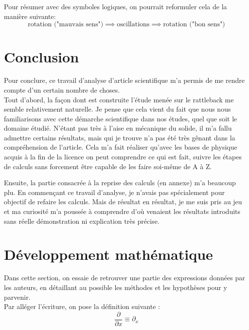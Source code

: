 \documentclass[12pt,a4paper]{article}
\begin{document}
	Pour résumer avec des symboles logiques, on pourrait reformuler cela de la manière suivante:
	$$\text{rotation ("mauvais sens")}\implies\text{oscillations}\implies\text{rotation ("bon sens")}$$
	
	\section{Conclusion}
	Pour conclure, ce travail d'analyse d'article scientifique m'a permis de me rendre compte d'un certain nombre de choses.\\
	
	Tout d'abord, la façon dont est construite l'étude menée sur le rattleback me semble relativement naturelle. Je pense que cela vient du fait que nous nous familiarisons avec cette démarche scientifique dans nos études, quel que soit le domaine étudié. N'étant pas très à l'aise en mécanique du solide, il m'a fallu admettre certains résultats, mais qui je trouve n'a pas été très gênant dans la compréhension de l'article. Cela m'a fait réaliser qu'avec les bases de physique acquis à la fin de la licence on peut comprendre ce qui est fait, suivre les étapes de calculs sans forcement être capable de les faire soi-même de A à Z.
	
	Ensuite, la partie consacrée à la reprise des calculs (en annexe) m'a beaucoup plu. En commençant ce travail d'analyse, je n'avais pas spécialement pour objectif de refaire les calculs. Mais de résultat en résultat, je me suis pris au jeu et ma curiosité m'a poussée à comprendre d'où venaient les résultats introduits sans réelle démonstration ni explication très précise.

	\pagebreak
	\appendix
	\appendixpage
	\section{Développement mathématique}
	\label{sec:calculs}
	Dans cette section, on essaie de retrouver une partie des expressions données par les auteurs, en détaillant au possible les méthodes et les hypothèses pour y parvenir.\\
	Par alléger l'écriture, on pose la définition suivante :
	$$\dfrac{\partial}{\partial x}\equiv\partial_x$$ 
\end{document}
